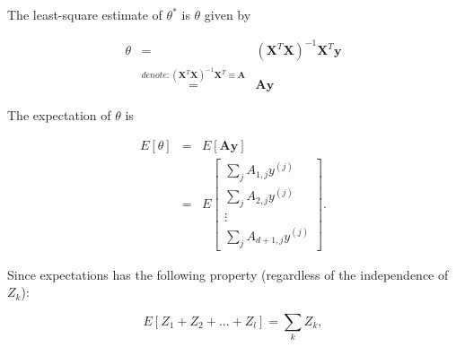 \documentclass[english,11pt]{article}
\begin{document}
The least-square estimate of $\theta^{*}$ is $\theta$ given by

\begin{eqnarray}
\theta & = & (\boldsymbol{X}^{T}\boldsymbol{X})^{-1}\boldsymbol{X}^{T}\boldsymbol{y}\\
 & \overset{denote:(\boldsymbol{X}^{T}\boldsymbol{X})^{-1}\boldsymbol{X}^{T}\equiv\boldsymbol{A}}{=} & \boldsymbol{A}\boldsymbol{y}
\end{eqnarray}

The expectation of $\theta$ is

\begin{eqnarray}
E[\theta] & = & E[\boldsymbol{A}\boldsymbol{y}]\\
 & = & E\left[\begin{array}{c}
\sum_{j}A_{1,j}y^{(j)}\\
\sum_{j}A_{2,j}y^{(j)}\\
\vdots\\
\sum_{j}A_{d+1,j}y^{(j)}
\end{array}\right].
\end{eqnarray}

Since expectations has the following property (regardless of the independence
of $Z_{k}$):

\begin{equation}
E[Z_{1}+Z_{2}+...+Z_{l}]=\sum_{k}Z_{k},    
\end{equation}
\end{document}
